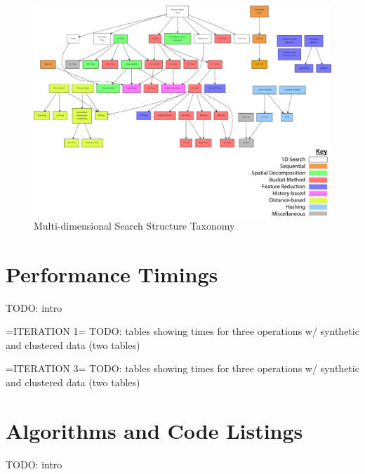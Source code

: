 \begin{landscape}
	\null  %
	\nointerlineskip  %
	\vfill
	\let\snewpage \newpage
	\let\newpage \relax
		\begin{figure}[H]
			\centering
			\includegraphics[scale=0.35]{figures/md_structure_taxonomy.png}
			\caption{Multi-dimensional Search Structure Taxonomy}
			\label{fig:structure-taxonomy}
		\end{figure}
	\let \newpage \snewpage
	\vfill 
	\break %

	\newpage

\end{landscape}




\section{Performance Timings}

TODO: intro

=ITERATION 1=
TODO: tables showing times for three operations w/ synthetic and clustered data (two tables)

=ITERATION 3=
TODO: tables showing times for three operations w/ synthetic and clustered data (two tables)




\section{Algorithms and Code Listings}

TODO: intro

